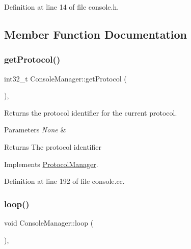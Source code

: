 Definition at line 14 of file console.\+h.



\subsection{Member Function Documentation}
\mbox{\label{classConsoleManager_a12c11521d46af302d6c7d79d3b8174b4}} 
\subsubsection{\texorpdfstring{get\+Protocol()}{getProtocol()}}
{\footnotesize\ttfamily int32\+\_\+t Console\+Manager\+::get\+Protocol (\begin{DoxyParamCaption}{ }\end{DoxyParamCaption})\hspace{0.3cm}{\ttfamily [override]}, {\ttfamily [virtual]}}



Returns the protocol identifier for the current protocol. 


\begin{DoxyParams}{Parameters}
{\em None} & \\
\hline
\end{DoxyParams}
\begin{DoxyReturn}{Returns}
The protocol identifier 
\end{DoxyReturn}


Implements \mbox{\hyperlink{classProtocolManager_a2ab274fd7510b28e7ac36405aebdbe82}{Protocol\+Manager}}.



Definition at line 192 of file console.\+cc.

\mbox{\label{classConsoleManager_a69261543a87cf7d3c7ec004c566145fd}} 
\subsubsection{\texorpdfstring{loop()}{loop()}}
{\footnotesize\ttfamily void Console\+Manager\+::loop (\begin{DoxyParamCaption}{ }\end{DoxyParamCaption})\hspace{0.3cm}{\ttfamily [override]}, {\ttfamily [virtual]}}



